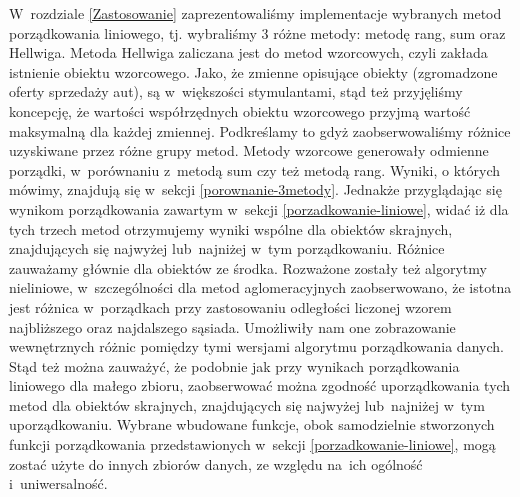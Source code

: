 \documentclass[12pt,a4paper]{report}
\begin{document}
W~rozdziale \ref{Zastosowanie} zaprezentowaliśmy implementacje wybranych metod porządkowania liniowego, tj. wybraliśmy 3 różne metody: metodę rang, sum oraz Hellwiga. Metoda Hellwiga zaliczana jest do metod wzorcowych, czyli zakłada istnienie obiektu wzorcowego. Jako, że zmienne opisujące obiekty (zgromadzone oferty sprzedaży aut), są w~większości stymulantami, stąd też przyjęliśmy koncepcję, że wartości współrzędnych obiektu wzorcowego przyjmą wartość maksymalną dla każdej zmiennej. Podkreślamy to gdyż zaobserwowaliśmy różnice uzyskiwane przez różne grupy metod. Metody wzorcowe generowały odmienne porządki, w~porównaniu z~metodą sum czy też metodą rang. Wyniki, o których mówimy, znajdują się w~sekcji \ref{porownanie-3metody}. Jednakże przyglądając się wynikom porządkowania zawartym  w~sekcji \ref{porzadkowanie-liniowe}, widać iż dla tych trzech metod otrzymujemy wyniki wspólne dla obiektów skrajnych, znajdujących się najwyżej lub~najniżej w~tym porządkowaniu. Różnice zauważamy głównie dla obiektów ze środka. %
Rozważone zostały też algorytmy nieliniowe, w~szczególności dla metod aglomeracyjnych zaobserwowano, że 
istotna jest różnica w~porządkach przy zastosowaniu odległości liczonej wzorem najbliższego oraz najdalszego sąsiada. Umożliwiły nam one zobrazowanie wewnętrznych różnic pomiędzy tymi wersjami algorytmu porządkowania danych. Stąd też można zauważyć, że podobnie jak przy wynikach porządkowania liniowego dla małego zbioru, zaobserwować można zgodność uporządkowania tych metod dla obiektów skrajnych, znajdujących się najwyżej lub~najniżej w~tym uporządkowaniu.
Wybrane wbudowane funkcje, obok samodzielnie stworzonych funkcji porządkowania przedstawionych w~sekcji \ref{porzadkowanie-liniowe}, mogą zostać użyte do innych zbiorów danych, ze względu na~ich ogólność i~uniwersalność. 
 


\end{document}
